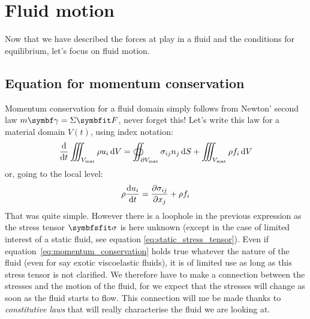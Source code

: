 \section{Fluid motion}
Now that we have described the forces at play in a fluid and the conditions for equilibrium, let's focus on fluid motion. 

\subsection{Equation for momentum conservation}
Momentum conservation for a fluid domain simply follows from Newton' second law $m \symbf \gamma = \Sigma \bF$, never forget this!
Let's write this law for a material domain $V(t)$, using index notation:
\begin{equation}
\frac{\mathrm d }{\mathrm d t} \iiint_{V_\text{mat}} \rho u_i\,\mathrm dV = \oiint_{\partial V_\text{mat}} \sigma_{ij} n_j\,\mathrm dS + \iiint _{V_\text{mat}}\rho f_i \,\mathrm dV
\end{equation}
or, going to the local level:
\begin{equation}
\rho \frac{\mathrm d u_i}{\mathrm d t} = \frac{\partial \sigma_{ij}}{\partial x_j} + \rho f_i 
\label{eq:momentum_conservation}
\end{equation}
That was quite simple. However there is a loophole in the previous expression as the stress tensor $\symbfsfit \sigma$ is here unknown (except in the case of limited interest of a static fluid, see equation \eqref{eq:static_stress_tensor}). Even if equation~\eqref{eq:momentum_conservation} holds true whatever the nature of the fluid (even for say exotic viscoelastic fluids), it is of limited use as long as this stress tensor is not clarified. We therefore have to make a connection between the stresses and the motion of the fluid, for we expect that the stresses will change as soon as the fluid starts to flow. This connection will me be made thanks to \textit{constitutive laws} that will really characterise the fluid we are looking at.


